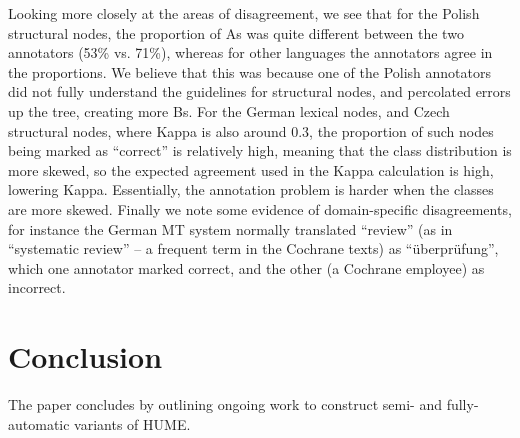 \documentclass[11pt]{article}
\begin{document}
Looking more closely at the areas of disagreement, we see that for the Polish structural nodes, the 
proportion of As was quite different between the two annotators (53\% vs. 71\%), whereas for other
languages the annotators agree in the proportions. We believe that this was because one of the Polish
annotators did not fully understand the guidelines for structural nodes, and percolated
errors up the tree, creating more Bs. For the German lexical nodes, and Czech structural nodes, where
Kappa is also around 0.3, the proportion of such nodes being marked as ``correct'' is relatively 
high, meaning that the class distribution is more skewed, so the expected agreement used in the
Kappa calculation is high, lowering Kappa. Essentially, the annotation problem is harder when the classes
are more skewed. Finally we note some evidence of domain-specific disagreements, for instance the German
MT system normally translated ``review'' (as in ``systematic review'' -- a frequent term in the 
Cochrane texts) as ``\"uberpr\"ufung'', which 
one annotator marked correct, and the other (a Cochrane employee)  as incorrect.





\section{Conclusion}\label{sec:conclusion}

The paper concludes by outlining ongoing work to construct semi- and
fully-automatic variants of HUME.
\end{document}
